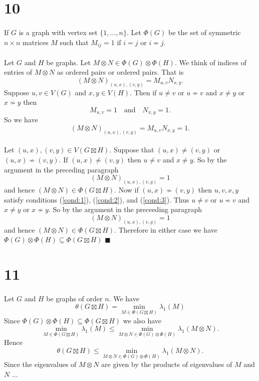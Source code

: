 \documentclass[letterpaper,12pt,oneside,onecolumn]{article}
\newcommand{\1}{\mathbbm{1}}
\begin{document}
\section*{10}
\paragraph{}
If $G$ is a graph with vertex set $\{1,\dots, n\}$. Let $\Phi(G)$ be the set of symmetric $n\times n$ matrices $M$ such that $M_{ij} = 1$ if $i=j$ or $i \not\sim j$.
\paragraph{}
Let $G$ and $H$ be graphs. Let $M \otimes N \in \Phi(G) \otimes \Phi(H)$. We think of indices of entries of $M \otimes N$ as ordered pairs or ordered pairs. That is
$$(M \otimes N)_{(u,x), (v,y)} = M_{u,v} N_{x,y}.$$ Suppose $u,v \in V(G)$ and $x,y \in V(H)$. Then if $u \neq v$ or $u \not\sim v$ and $x \neq y$ or $x \not \sim y$ then 
$$M_{u,v} = 1 \quad\text{and}\quad N_{x,y} = 1.$$
So we have
$$(M \otimes N)_{(u,x), (v,y)} = M_{u,v} N_{x,y} = 1.$$
\paragraph{}
Let $(u,x), (v,y) \in V(G \boxtimes H)$. Suppose that $(u,x) \neq (v,y)$ or $(u,x) \not\sim (v,y)$. If $(u,x) \neq (v,y)$ then $u\neq v$ and $x \neq y$. So by the argument in the preceding paragraph
$$(M \otimes N)_{(u,x), (v,y)} = 1$$
and hence $(M \otimes N) \in \Phi(G \boxtimes H)$. Now if $(u,x) \not\sim (v,y)$ then $u,v,x,y$ satisfy conditions (\ref{cond:1}), (\ref{cond:2}), and (\ref{cond:3}). Thus $u \neq v$ or $u \not\sim v$ and $x \neq y$ or $x \not \sim y$. So by the argument in the preceeding paragraph $$(M \otimes N)_{(u,x), (v,y)} = 1$$
and hence $(M \otimes N) \in \Phi(G \boxtimes H)$.  Therefore in either case we have $\Phi(G) \otimes \Phi(H) \subseteq \Phi(G \boxtimes H)$ $\blacksquare$
\section*{11}
\paragraph{}
Let $G$ and $H$ be graphs of order $n$. We have
$$\theta(G\boxtimes H) = \min_{M \in \Phi(G\boxtimes H)} \lambda_1(M)$$
Since $\Phi(G) \otimes \Phi(H) \subseteq \Phi(G\boxtimes H)$ we also have
$$\min_{M \in \Phi(G\boxtimes H)} \lambda_1(M) \leq \min_{M\otimes N \in \Phi(G) \otimes \Phi(H) }\lambda_1(M\otimes N).$$
Hence
$$\theta(G\boxtimes H) \leq \min_{M\otimes N \in \Phi(G) \otimes \Phi(H) }\lambda_1(M\otimes N).$$
Since the eigenvalues of $M \otimes N$ are given by the products of eigenvalues of $M$ and $N$ ...
\end{document}
